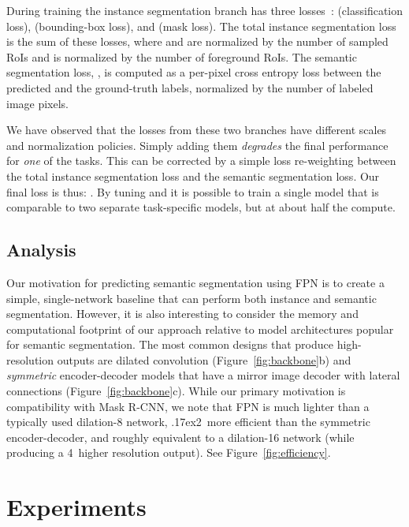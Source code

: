 \documentclass[10pt,twocolumn,letterpaper]{article}
\makeatletter
\newcommand{\app}{\raise.17ex\hbox{}}
\newcommand{\x}{}
\renewcommand\paragraph{\@startsection{paragraph}{4}{\z@}{.5em \@plus1ex \@minus.1ex}{-.5em}{\normalfont\normalsize\bfseries}}
\makeatother
\begin{document}
{\paragraph{Joint training:} During training the instance segmentation branch has three losses~\cite{he2017mask}:  (classification loss),  (bounding-box loss), and  (mask loss). The total instance segmentation loss is the sum of these losses, where  and  are normalized by the number of sampled  RoIs and  is normalized by the number of foreground RoIs. The semantic segmentation loss, , is computed as a per-pixel cross entropy loss between the predicted and the ground-truth labels, normalized by the number of labeled image pixels.

We have observed that the losses from these two branches have different scales and normalization policies. Simply adding them \emph{degrades} the final performance for \emph{one} of the tasks. This can be corrected by a simple loss re-weighting between the total instance segmentation loss and the semantic segmentation loss. Our final loss is thus: . By tuning  and  it is possible to train a single model that is comparable to two separate task-specific models, but at about half the compute.

\subsection{Analysis}

Our motivation for predicting semantic segmentation using FPN is to create a simple, single-network baseline that can perform both instance and semantic segmentation. However, it is also interesting to consider the memory and computational footprint of our approach relative to model architectures popular for semantic segmentation. The most common designs that produce high-resolution outputs are dilated convolution (Figure~\ref{fig:backbone}b) and \emph{symmetric} encoder-decoder models that have a mirror image decoder with lateral connections (Figure~\ref{fig:backbone}c). While our primary motivation is compatibility with Mask R-CNN, we note that FPN is much lighter than a typically used dilation-8 network, \app2\x~more efficient than the symmetric encoder-decoder, and roughly equivalent to a dilation-16 network (while producing a 4\x~higher resolution output). See Figure~\ref{fig:efficiency}.

\section{Experiments}

}
\end{document}
